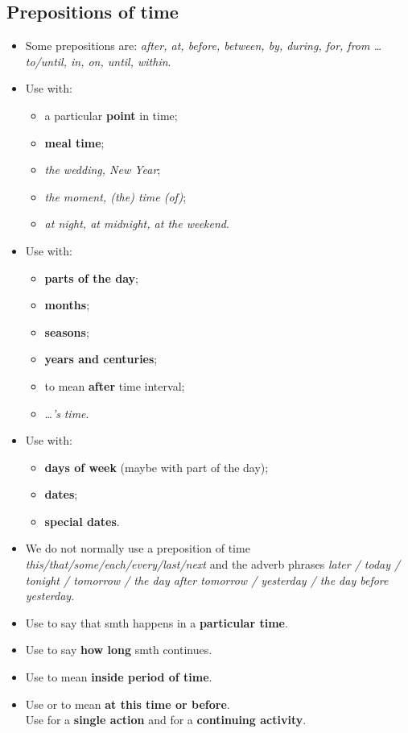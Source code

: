 \subsection{Prepositions of time}
\begin{itemize}
    \item Some prepositions are: \textit{after, at, before, between, by,
        during, for, from \ldots{} to/until, in, on, until, within}.
    \item Use  with:
    \begin{itemize}
        \item a particular \textbf{point} in time;
        \item \textbf{meal time};
        \item {} \textit{the wedding, New Year};
        \item {} \textit{the moment, (the) time (of)};
        \item[\ast] \textit{at night, at midnight, at the weekend}.
    \end{itemize}
    \item Use  with:
    \begin{itemize}
        \item \textbf{parts of the day};
        \item \textbf{months};
        \item \textbf{seasons};
        \item \textbf{years and centuries};
        \item to mean \textbf{after} time interval;
        \item[\daash]  \ldots{}\textit{'s} \textit{time}.
    \end{itemize}
    \item Use  with:
    \begin{itemize}
        \item \textbf{days of week} (maybe with part of the day);
        \item \textbf{dates};
        \item[\daash] \textbf{special dates}.
    \end{itemize}
    \item We do not normally use a preposition of time 
    \textit{this/that/some/each/every\slash{}last\slash{}next}
    and  the adverb phrases
    \textit{later / today / tonight / tomorrow / the day after tomorrow / yesterday / the day before yesterday}.
    \item[\doot] Use  to say that smth happens in a \textbf{particular time}.
    \item[\doot] Use  to say \textbf{how long} smth continues.
    \item[\doot] Use  to mean \textbf{inside period of time}.
    \item[\doot] Use  or  to mean \textbf{at this time or before}.\\
    Use  for a \textbf{single action} and  for a \textbf{continuing activity}.
\end{itemize}

